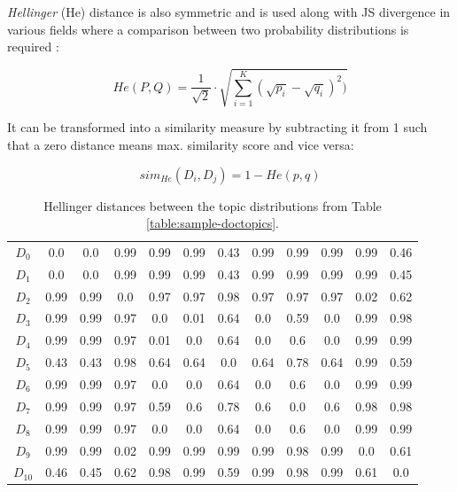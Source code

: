 \textit{Hellinger} (He) distance is also symmetric and is used along with JS divergence in various fields where a comparison between two probability distributions is required \citep{Blei2007a,Hall2008,Boyd-Graber2010}:

\begin{equation}
	He(P, Q) = \frac{1}{\sqrt{2}}\cdot\sqrt{\sum\limits_{i=1}^K (\sqrt{p_i} - \sqrt{q_i})^2)}
	\label{eq:hedistance}
\end{equation}

It can be transformed into a similarity measure by subtracting it from 1 \citep{Rus2013} such that a zero distance means max. similarity score and vice versa:

\begin{equation}
	sim_{He}(D_i, D_j) = 1 - He(p,q)
	\label{eq:simhe}
\end{equation}


\begin{table}[!htbp]
\centering%
\small
\begin{tabularx}{\linewidth}{CCCCCCCCCCCC}
\toprule
\heading{} &  &  &  &  &  &  &  &  &  &  &  \\
\midrule
\midrule
$D_0$&0.0&0.0&0.99&0.99&0.99&0.43&0.99&0.99&0.99&0.99&0.46\\
\midrule
$D_1$&0.0&0.0&0.99&0.99&0.99&0.43&0.99&0.99&0.99&0.99&0.45\\
\midrule
$D_2$&0.99&0.99&0.0&0.97&0.97&0.98&0.97&0.97&0.97&0.02&0.62\\
\midrule
$D_3$&0.99&0.99&0.97&0.0&0.01&0.64&0.0&0.59&0.0&0.99&0.98\\
\midrule
$D_4$&0.99&0.99&0.97&0.01&0.0&0.64&0.0&0.6&0.0&0.99&0.99\\
\midrule
$D_5$&0.43&0.43&0.98&0.64&0.64&0.0&0.64&0.78&0.64&0.99&0.59\\
\midrule
$D_6$&0.99&0.99&0.97&0.0&0.0&0.64&0.0&0.6&0.0&0.99&0.99\\
\midrule
$D_7$&0.99&0.99&0.97&0.59&0.6&0.78&0.6&0.0&0.6&0.98&0.98\\
\midrule
$D_8$&0.99&0.99&0.97&0.0&0.0&0.64&0.0&0.6&0.0&0.99&0.99\\
\midrule
$D_9$&0.99&0.99&0.02&0.99&0.99&0.99&0.99&0.98&0.99&0.0&0.61\\
\midrule
$D_{10}$&0.46&0.45&0.62&0.98&0.99&0.59&0.99&0.98&0.99&0.61&0.0\\
\midrule
\bottomrule
\end{tabularx}
\caption{Hellinger distances between the topic distributions from Table \ref{table:sample-doctopics}.}
\label{table:he-distances}
\end{table}


